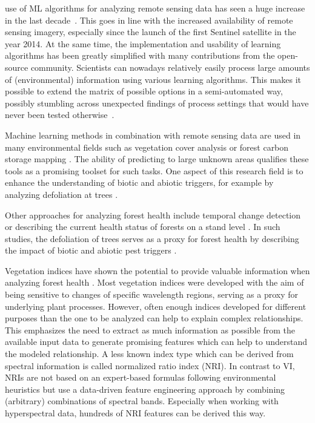 \documentclass[letterpaper, peerreview]{IEEEtran}
\begin{document}
 use of \ac{ML} algorithms for analyzing remote sensing data has seen a huge increase in the last decade~\cite{lary2016}.
This goes in line with the increased availability of remote sensing imagery, especially since the launch of the first Sentinel satellite in the year 2014.
At the same time, the implementation and usability of learning algorithms has been greatly simplified with many contributions from the open-source community.
Scientists can nowadays relatively easily process large amounts of (environmental) information using various learning algorithms.
This makes it possible to extend the matrix of possible options in a semi-automated way, possibly stumbling across unexpected findings of process settings that would have never been tested otherwise~\cite{ma2015}.


Machine learning methods in combination with remote sensing data are used in many environmental fields such as vegetation cover analysis or forest carbon storage mapping \cite{mascaro2014, urban2018}.
The ability of predicting to large unknown areas qualifies these tools as a promising toolset for such tasks.
One aspect of this research field is to enhance the understanding of biotic and abiotic triggers, for example by analyzing defoliation at trees \cite{hawrylo2018}.

Other approaches for analyzing forest health include temporal change detection \cite{zhang2016} or describing the current health status of forests on a stand level \cite{townsend2012}.
In such studies, the defoliation of trees serves as a proxy for forest health by describing the impact of biotic and abiotic pest triggers \cite{townsend2012, goodbody2018}.

Vegetation indices have shown the potential to provide valuable information when analyzing forest health \cite{jiang2014, adamczyk2015}.
Most vegetation indices were developed with the aim of being sensitive to changes of specific wavelength regions, serving as a proxy for underlying plant processes. 
However, often enough indices developed for different purposes than the one to be analyzed can help to explain complex relationships.
This emphasizes the need to extract as much information as possible from the available input data to generate promising features which can help to understand the modeled relationship.
A less known index type which can be derived from spectral information is called normalized ratio index (NRI).
In contrast to \ac{VI}, \ac{NRI}s are not based on an expert-based formulas following environmental heuristics but use a data-driven feature engineering approach by combining (arbitrary) combinations of spectral bands.
Especially when working with hyperspectral data, hundreds of \ac{NRI} features can be derived this way.
\end{document}
